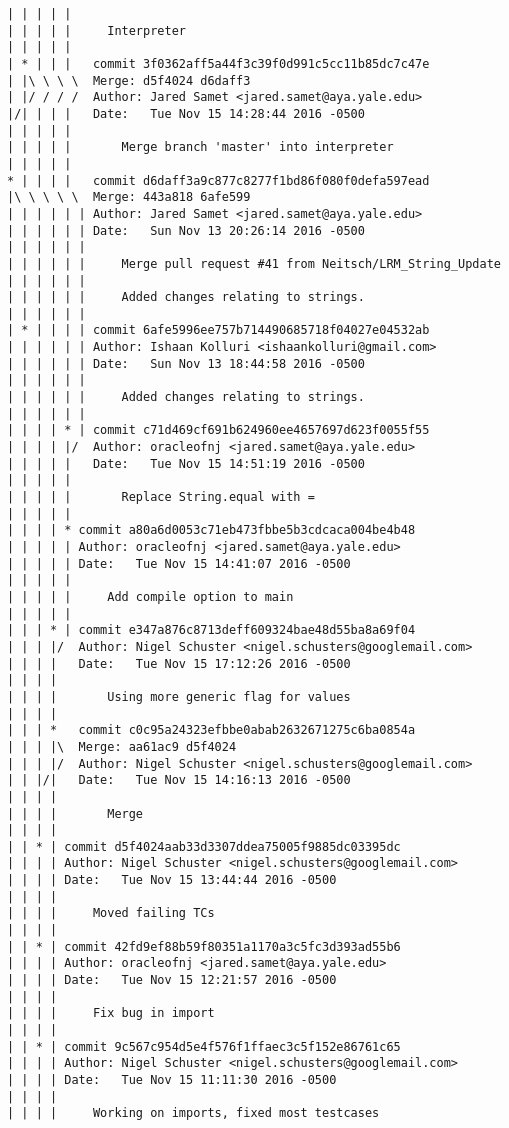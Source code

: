 \begin{lstlisting}
| | | | |     
| | | | |     Interpreter
| | | | |        
| * | | |   commit 3f0362aff5a44f3c39f0d991c5cc11b85dc7c47e
| |\ \ \ \  Merge: d5f4024 d6daff3
| |/ / / /  Author: Jared Samet <jared.samet@aya.yale.edu>
|/| | | |   Date:   Tue Nov 15 14:28:44 2016 -0500
| | | | |   
| | | | |       Merge branch 'master' into interpreter
| | | | |        
* | | | |   commit d6daff3a9c877c8277f1bd86f080f0defa597ead
|\ \ \ \ \  Merge: 443a818 6afe599
| | | | | | Author: Jared Samet <jared.samet@aya.yale.edu>
| | | | | | Date:   Sun Nov 13 20:26:14 2016 -0500
| | | | | | 
| | | | | |     Merge pull request #41 from Neitsch/LRM_String_Update
| | | | | |     
| | | | | |     Added changes relating to strings.
| | | | | |       
| * | | | | commit 6afe5996ee757b714490685718f04027e04532ab
| | | | | | Author: Ishaan Kolluri <ishaankolluri@gmail.com>
| | | | | | Date:   Sun Nov 13 18:44:58 2016 -0500
| | | | | | 
| | | | | |     Added changes relating to strings.
| | | | | |       
| | | | * | commit c71d469cf691b624960ee4657697d623f0055f55
| | | | |/  Author: oracleofnj <jared.samet@aya.yale.edu>
| | | | |   Date:   Tue Nov 15 14:51:19 2016 -0500
| | | | |   
| | | | |       Replace String.equal with =
| | | | |      
| | | | * commit a80a6d0053c71eb473fbbe5b3cdcaca004be4b48
| | | | | Author: oracleofnj <jared.samet@aya.yale.edu>
| | | | | Date:   Tue Nov 15 14:41:07 2016 -0500
| | | | | 
| | | | |     Add compile option to main
| | | | |      
| | | * | commit e347a876c8713deff609324bae48d55ba8a69f04
| | | |/  Author: Nigel Schuster <nigel.schusters@googlemail.com>
| | | |   Date:   Tue Nov 15 17:12:26 2016 -0500
| | | |   
| | | |       Using more generic flag for values
| | | |       
| | | *   commit c0c95a24323efbbe0abab2632671275c6ba0854a
| | | |\  Merge: aa61ac9 d5f4024
| | | |/  Author: Nigel Schuster <nigel.schusters@googlemail.com>
| | |/|   Date:   Tue Nov 15 14:16:13 2016 -0500
| | | |   
| | | |       Merge
| | | |     
| | * | commit d5f4024aab33d3307ddea75005f9885dc03395dc
| | | | Author: Nigel Schuster <nigel.schusters@googlemail.com>
| | | | Date:   Tue Nov 15 13:44:44 2016 -0500
| | | | 
| | | |     Moved failing TCs
| | | |     
| | * | commit 42fd9ef88b59f80351a1170a3c5fc3d393ad55b6
| | | | Author: oracleofnj <jared.samet@aya.yale.edu>
| | | | Date:   Tue Nov 15 12:21:57 2016 -0500
| | | | 
| | | |     Fix bug in import
| | | |     
| | * | commit 9c567c954d5e4f576f1ffaec3c5f152e86761c65
| | | | Author: Nigel Schuster <nigel.schusters@googlemail.com>
| | | | Date:   Tue Nov 15 11:11:30 2016 -0500
| | | | 
| | | |     Working on imports, fixed most testcases

\end{lstlisting}
